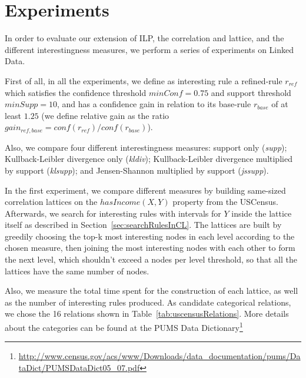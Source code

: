 \chapter{Experiments}
\label{ch:intro}

In order to evaluate our extension of ILP, the correlation and lattice, and the different interestingness measures, we
perform a series of experiments on Linked Data.

First of all, in all the experiments, we define as interesting rule a refined-rule $r_{ref}$ which satisfies the
confidence threshold $minConf=0.75$ and support threshold $minSupp=10$, and has a confidence gain in relation to its
base-rule $r_{base}$ of at least $1.25$ (we define relative gain as the ratio
$gain_{ref,base}=conf(r_{ref})/conf(r_{base})$).

Also, we compare four different interestingness measures: support only (\emph{supp});
Kullback-Leibler divergence only (\emph{kldiv}); Kullback-Leibler divergence multiplied by support (\emph{klsupp}); and
Jensen-Shannon multiplied by support (\emph{jssupp}). 

In the first experiment, we compare different measures by building same-sized correlation lattices on the
$hasIncome(X,Y)$ property from the USCensus. Afterwards, we search for interesting rules with intervals for $Y$ inside
the lattice itself as described in Section~\ref{sec:searchRulesInCL}. The lattices are built by greedily choosing the
top-k most interesting nodes in each level according to the chosen measure, then joining the most interesting nodes
with each other to form the next level, which shouldn't exceed a nodes per level threshold, so that all the lattices
have the same number of nodes.

Also, we measure the total time spent for the construction of each lattice, as well as the number of interesting rules
produced. As candidate categorical relations, we chose the 16 relations shown in Table~\ref{tab:uscensusRelations}.
More details about the categories can be found at the PUMS Data Dictionary\footnote{\url{
http://www.census.gov/acs/www/Downloads/data_documentation/pums/DataDict/PUMSDataDict05_07.pdf}
}

